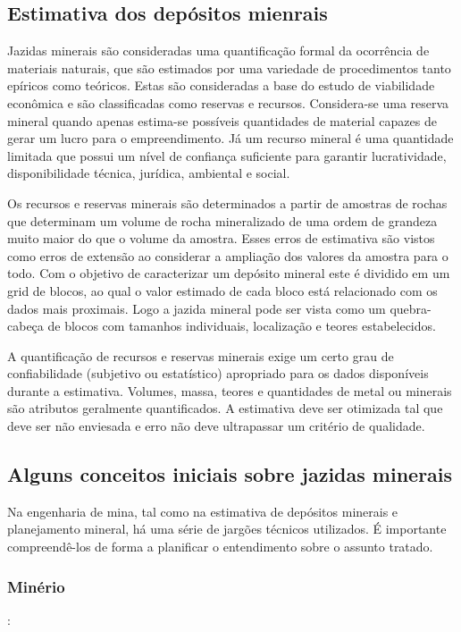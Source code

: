  \subsection{Estimativa dos depósitos mienrais}

Jazidas minerais são consideradas uma quantificação formal da ocorrência de materiais naturais, que são estimados por uma variedade de procedimentos tanto epíricos como teóricos. Estas são consideradas a base do estudo de viabilidade econômica  e são classificadas como reservas e recursos. Considera-se uma reserva mineral quando apenas estima-se possíveis quantidades de material capazes de gerar um lucro para o empreendimento. Já um recurso mineral é uma quantidade limitada que possui um nível de confiança suficiente para garantir lucratividade, disponibilidade técnica, jurídica, ambiental e social. 

Os recursos e reservas minerais são determinados a partir de amostras de rochas que determinam um volume de rocha mineralizado de uma ordem de grandeza muito maior do que o volume da amostra. Esses erros de estimativa são vistos como erros de extensão ao considerar a ampliação dos valores da amostra para o todo. Com o objetivo de caracterizar um depósito mineral este é dividido em um grid de blocos, ao qual o valor estimado de cada bloco está relacionado com os dados mais proximais. Logo a jazida mineral pode ser vista como um quebra-cabeça de blocos com tamanhos individuais, localização e teores estabelecidos.

A quantificação de recursos e reservas minerais exige um certo grau de confiabilidade (subjetivo ou estatístico) apropriado para os dados disponíveis durante a estimativa. Volumes, massa, teores e quantidades de metal ou minerais são atributos geralmente quantificados. A estimativa deve ser otimizada tal que deve ser não enviesada e erro não deve ultrapassar um critério de qualidade. 

 \subsection{Alguns conceitos iniciais sobre jazidas minerais}
 
 Na engenharia de mina, tal como na estimativa de depósitos minerais e planejamento mineral, há uma série de jargões técnicos utilizados. É importante compreendê-los de forma a planificar o entendimento sobre o assunto tratado. 
 
 	\subsubsection{Minério} : 
 	
